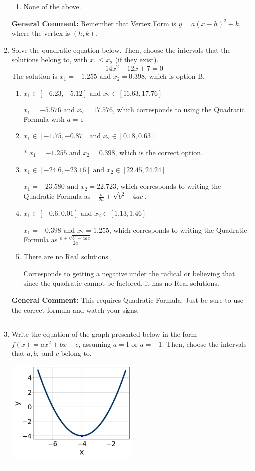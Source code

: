 \documentclass{extbook}[14pt]
\newcommand{\litem}[1]{\item #1

\rule{\textwidth}{0.4pt}}
\begin{document}
\begin{enumerate}
{\begin{enumerate}[label=\Alph*.]
\begin{multicols}{2}
\end{multicols}\item None of the above.\end{enumerate}
\textbf{General Comment:} Remember that Vertex Form is $y = a(x-h)^2+k$, where the vertex is $(h, k)$.
}
\litem{
Solve the quadratic equation below. Then, choose the intervals that the solutions belong to, with $x_1 \leq x_2$ (if they exist).
\[ -14x^{2} -12 x + 7 = 0 \]The solution is \( x_1 = -1.255 \text{ and } x_2 = 0.398 \), which is option B.\begin{enumerate}[label=\Alph*.]
\item \( x_1 \in [-6.23, -5.12] \text{ and } x_2 \in [16.63, 17.76] \)

 $x_1 = -5.576 \text{ and } x_2 = 17.576$, which corresponds to using the Quadratic Formula with $a=1$
\item \( x_1 \in [-1.75, -0.87] \text{ and } x_2 \in [0.18, 0.63] \)

* $x_1 = -1.255 \text{ and } x_2 = 0.398$, which is the correct option.
\item \( x_1 \in [-24.6, -23.16] \text{ and } x_2 \in [22.45, 24.24] \)

 $x_1 = -23.580 \text{ and } x_2 = 22.723$, which corresponds to writing the Quadratic Formula as $-\frac{b}{2a} \pm \sqrt{b^2 - 4ac}$.
\item \( x_1 \in [-0.6, 0.01] \text{ and } x_2 \in [1.13, 1.46] \)

 $x_1 = -0.398 \text{ and } x_2 = 1.255$, which corresponds to writing the Quadratic Formula as $\frac{b \pm \sqrt{b^2 - 4ac}}{2a}$
\item \( \text{There are no Real solutions.} \)

Corresponds to getting a negative under the radical or believing that since the quadratic cannot be factored, it has no Real solutions.
\end{enumerate}

\textbf{General Comment:} This requires Quadratic Formula. Just be sure to use the correct formula and watch your signs.
}
\litem{
Write the equation of the graph presented below in the form $f(x)=ax^2+bx+c$, assuming  $a=1$ or $a=-1$. Then, choose the intervals that $a, b,$ and $c$ belong to.

\begin{center}
    \includegraphics[width=0.5\textwidth]{../Figures/quadraticGraphToEquationC.png}
\end{center}


}
\end{enumerate}
\end{document}
